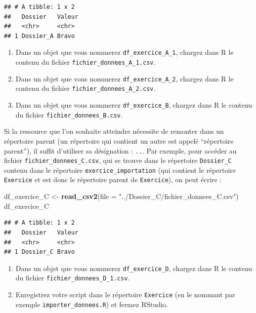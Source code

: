 \documentclass[
  11pt,
]{book}
\newenvironment{Shaded}{\begin{snugshade}}{\end{snugshade}}
\newcommand{\AttributeTok}[1]{\textcolor[rgb]{0.13,0.29,0.53}{#1}}
\newcommand{\FunctionTok}[1]{\textcolor[rgb]{0.13,0.29,0.53}{\textbf{#1}}}
\newcommand{\NormalTok}[1]{#1}
\newcommand{\OtherTok}[1]{\textcolor[rgb]{0.56,0.35,0.01}{#1}}
\newcommand{\StringTok}[1]{\textcolor[rgb]{0.31,0.60,0.02}{#1}}
\providecommand{\tightlist}{%
  \setlength{\itemsep}{0pt}\setlength{\parskip}{0pt}}
\numberwithin{equation}{section}
\numberwithin{countremarque}{section}
\newenvironment{greenbox}{
  \begin{tcolorbox}[breakable, colback=vert,coltext=black,
                  colframe=grisfonce]}
 {\end{tcolorbox}}
\begin{document}
\begin{lstlisting}
## # A tibble: 1 x 2
##   Dossier   Valeur
##   <chr>     <chr> 
## 1 Dossier_A Bravo
\end{lstlisting}

\begin{greenbox}

\begin{enumerate}
\def\labelenumi{\arabic{enumi}.}
\setcounter{enumi}{6}
\tightlist
\item
  Dans un objet que vous nommerez \texttt{df\_exercice\_A\_1}, chargez dans R le contenu du fichier \texttt{fichier\_donnees\_A\_1.csv}.
\item
  Dans un objet que vous nommerez \texttt{df\_exercice\_A\_2}, chargez dans R le contenu du fichier \texttt{fichier\_donnees\_A\_2.csv}.
\item
  Dans un objet que vous nommerez \texttt{df\_exercice\_B}, chargez dans R le contenu du fichier \texttt{fichier\_donnees\_B.csv}.
\end{enumerate}

\end{greenbox}

Si la ressource que l'on souhaite atteindre nécessite de remonter dans un répertoire parent (un répertoire qui contient un autre est appelé ``répertoire parent''), il suffit d'utiliser sa désignation : \texttt{..}. Par exemple, pour accéder au fichier \texttt{fichier\_donnees\_C.csv}, qui se trouve dans le répertoire \texttt{Dossier\_C} contenu dans le répertoire \texttt{exercice\_importation} (qui contient le répertoire \texttt{Exercice} et est donc le répertoire parent de \texttt{Exercice}), on peut écrire :

\begin{Shaded}
\begin{Highlighting}[]
\NormalTok{df\_exercice\_C }\OtherTok{\textless{}{-}} \FunctionTok{read\_csv2}\NormalTok{(}\AttributeTok{file =} \StringTok{"../Dossier\_C/fichier\_donnees\_C.csv"}\NormalTok{)}
\NormalTok{df\_exercice\_C}
\end{Highlighting}
\end{Shaded}

\begin{lstlisting}
## # A tibble: 1 x 2
##   Dossier   Valeur
##   <chr>     <chr> 
## 1 Dossier_C Bravo
\end{lstlisting}

\begin{greenbox}

\begin{enumerate}
\def\labelenumi{\arabic{enumi}.}
\setcounter{enumi}{9}
\tightlist
\item
  Dans un objet que vous nommerez \texttt{df\_exercice\_D}, chargez dans R le contenu du fichier \texttt{fichier\_donnees\_D\_1.csv}.
\item
  Enregistrez votre script dans le répertoire \texttt{Exercice} (en le nommant par exemple \texttt{importer\_donnees.R}) et fermez RStudio.
\end{enumerate}

\end{greenbox}
\end{document}
